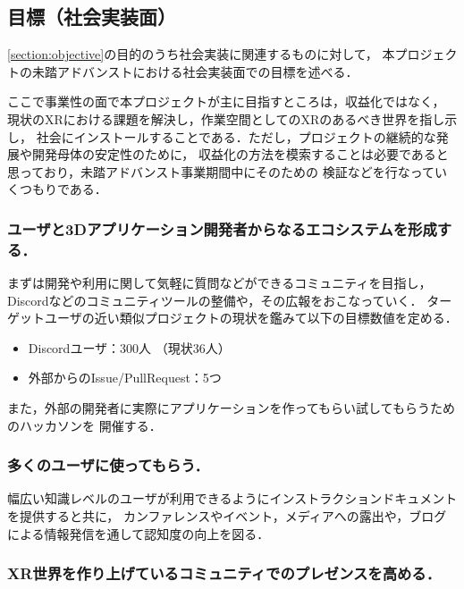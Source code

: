 \subsection{目標（社会実装面）}

\ref{section:objective}の目的のうち社会実装に関連するものに対して，
本プロジェクトの未踏アドバンストにおける社会実装面での目標を述べる．

ここで事業性の面で本プロジェクトが主に目指すところは，収益化ではなく，
現状のXRにおける課題を解決し，作業空間としてのXRのあるべき世界を指し示し，
社会にインストールすることである．ただし，プロジェクトの継続的な発展や開発母体の安定性のために，
収益化の方法を模索することは必要であると思っており，未踏アドバンスト事業期間中にそのための
検証などを行なっていくつもりである．

\subsubsection*{ユーザと3Dアプリケーション開発者からなるエコシステムを形成する．}

まずは開発や利用に関して気軽に質問などができるコミュニティを目指し，
Discordなどのコミュニティツールの整備や，その広報をおこなっていく．
ターゲットユーザの近い類似プロジェクトの現状を鑑みて以下の目標数値を定める．

\begin{itemize}
  \item Discordユーザ：300人 （現状36人）
  \item 外部からのIssue/PullRequest：5つ
\end{itemize}

また，外部の開発者に実際にアプリケーションを作ってもらい試してもらうためのハッカソンを
開催する．

\subsubsection*{多くのユーザに使ってもらう．}

幅広い知識レベルのユーザが利用できるようにインストラクションドキュメントを提供すると共に，
カンファレンスやイベント，メディアへの露出や，ブログによる情報発信を通して認知度の向上を図る．

\subsubsection*{XR世界を作り上げているコミュニティでのプレゼンスを高める．}

